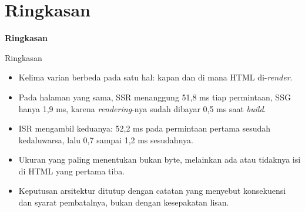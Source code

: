 \documentclass[aspectratio=169, table, 12pt]{beamer}
\begin{document}
\section{Ringkasan}

\begin{frame}{\hfill}
  \centering
  \Huge{\textbf{Ringkasan}}
\end{frame}

\begin{frame}{{\Large Ringkasan}}
  \vspace{8pt}
  \begin{itemize}
    \item Kelima varian berbeda pada satu hal: kapan dan di mana HTML
          di-\textit{render}.
    \item Pada halaman yang sama, SSR menanggung 51,8 ms tiap permintaan,
          SSG hanya 1,9 ms, karena \textit{rendering}-nya sudah dibayar 0,5 ms
          saat \textit{build}.
    \item ISR mengambil keduanya: 52,2 ms pada permintaan pertama sesudah
          kedaluwarsa, lalu 0,7 sampai 1,2 ms sesudahnya.
    \item Ukuran yang paling menentukan bukan byte, melainkan ada atau
          tidaknya isi di HTML yang pertama tiba.
    \item Keputusan arsitektur ditutup dengan catatan yang menyebut
          konsekuensi dan syarat pembatalnya, bukan dengan kesepakatan lisan.
  \end{itemize}
\end{frame}
\end{document}
